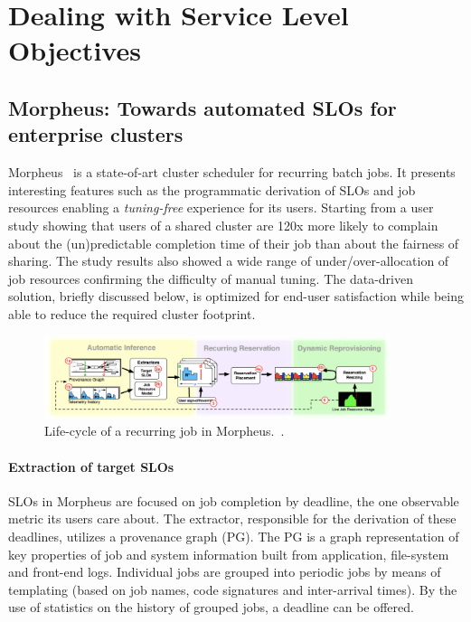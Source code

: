 \section{Dealing with Service Level Objectives}

\subsection{Morpheus: Towards automated SLOs for enterprise clusters}
\label{rw:morpheus}
Morpheus~\cite{jyothi2016morpheus} is a state-of-art cluster scheduler for recurring batch jobs. It presents interesting features such as the programmatic derivation of SLOs and job resources enabling a \textit{tuning-free} experience for its users. Starting from a user study showing that users of a shared cluster are 120x more likely to complain about the (un)predictable completion time of their job than about the fairness of sharing. The study results also showed a wide range of under/over-allocation of job resources confirming the difficulty of manual tuning. The data-driven solution, briefly discussed below, is optimized for end-user satisfaction while being able to reduce the required cluster footprint.
\begin{figure}[H]
    \centering
    \includegraphics[width=0.9\textwidth]{chapter-related-work/images-morpheus/morpheus-fig.png}
    \caption{Life-cycle of a recurring job in Morpheus.~\cite{jyothi2016morpheus}.}
    \label{fig:morpheus}
\end{figure}
\paragraph{Extraction of target SLOs}
 SLOs in Morpheus are focused on job completion by deadline, the one observable metric its users care about. The extractor, responsible for the derivation of these deadlines, utilizes a provenance graph (PG). The PG is a graph representation of key properties of job and system information built from application, file-system and front-end logs. Individual jobs are grouped into periodic jobs by means of templating (based on job names, code signatures and inter-arrival times). By the use of statistics on the history of grouped jobs, a deadline can be offered.
